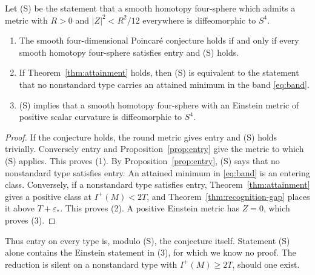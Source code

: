 
\begin{proposition}\label{prop:logical-form}
Let \textup{(S)} be the statement that a smooth homotopy four-sphere
which admits a metric with \(R>0\) and \(|Z|^2<R^2/12\) everywhere is
diffeomorphic to \(S^4\).
\begin{enumerate}
\item The smooth four-dimensional Poincar\'e conjecture holds if and
only if every smooth homotopy four-sphere satisfies entry and
\textup{(S)} holds.
\item If Theorem~\ref{thm:attainment} holds, then \textup{(S)} is
equivalent to the statement that no nonstandard type carries an
attained minimum in the band \eqref{eq:band}.
\item \textup{(S)} implies that a smooth homotopy four-sphere with an
Einstein metric of positive scalar curvature is diffeomorphic to
\(S^4\).
\end{enumerate}
\end{proposition}
\begin{proof}
If the conjecture holds, the round metric gives entry and \textup{(S)}
holds trivially. Conversely entry and Proposition~\ref{prop:entry} give the
metric to which \textup{(S)} applies. This proves (1). By
Proposition~\ref{prop:entry}, \textup{(S)} says that no nonstandard
type satisfies entry. An attained minimum in \eqref{eq:band} is an
entering class. Conversely, if a nonstandard type satisfies entry,
Theorem~\ref{thm:attainment} gives a positive class at
\(I^+(M)<2T\), and Theorem~\ref{thm:recognition-gap} places it above
\(T+\varepsilon_*\). This proves (2). A positive Einstein metric has
\(Z=0\), which proves (3).
\end{proof}

Thus entry on every type is, modulo \textup{(S)}, the conjecture
itself. Statement \textup{(S)} alone contains the Einstein statement in
(3), for which we know no proof. The reduction is silent on a
nonstandard type with \(I^+(M)\ge2T\), should one exist.
